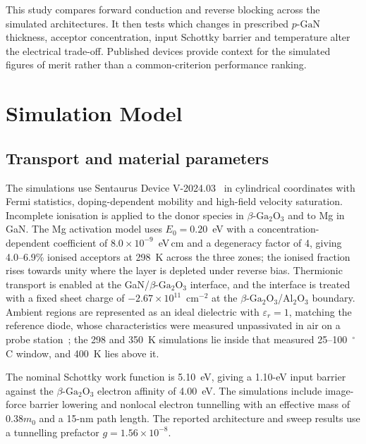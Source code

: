 \documentclass[journal,10pt]{IEEEtran}
\newcommand{\GaO}{\ensuremath{\beta\text{-}\mathrm{Ga}_2\mathrm{O}_3}}
\newcommand{\pGaN}{\ensuremath{p\text{-}\mathrm{GaN}}}
\begin{document}
This study compares forward conduction and reverse blocking across the simulated architectures. It then tests which changes in prescribed \pGaN{} thickness, acceptor concentration, input Schottky barrier and temperature alter the electrical trade-off. Published devices provide context for the simulated figures of merit rather than a common-criterion performance ranking.

\section{Simulation Model}
\subsection{Transport and material parameters}
The simulations use Sentaurus Device V-2024.03~\cite{Sentaurus2024} in cylindrical coordinates with Fermi statistics, doping-dependent mobility and high-field velocity saturation. Incomplete ionisation is applied to the donor species in \GaO{} and to Mg in GaN. The Mg activation model uses $E_0=0.20$~eV with a concentration-dependent coefficient of $8.0\times10^{-9}$~eV\,cm and a degeneracy factor of 4, giving 4.0--6.9\% ionised acceptors at 298~K across the three zones; the ionised fraction rises towards unity where the layer is depleted under reverse bias. Thermionic transport is enabled at the GaN/\GaO{} interface, and the interface is treated with a fixed sheet charge of $-2.67\times10^{11}$~cm$^{-2}$ at the \GaO/Al$_2$O$_3$ boundary. Ambient regions are represented as an ideal dielectric with $\varepsilon_r=1$, matching the reference diode, whose characteristics were measured unpassivated in air on a probe station~\cite{Yang2017}; the 298 and 350~K simulations lie inside that measured 25--100~$^\circ$C window, and 400~K lies above it.

The nominal Schottky work function is 5.10~eV, giving a 1.10-eV input barrier against the \GaO{} electron affinity of 4.00~eV. The simulations include image-force barrier lowering and nonlocal electron tunnelling with an effective mass of $0.38m_0$ and a 15-nm path length. The reported architecture and sweep results use a tunnelling prefactor $g=1.56\times10^{-8}$.
\end{document}
